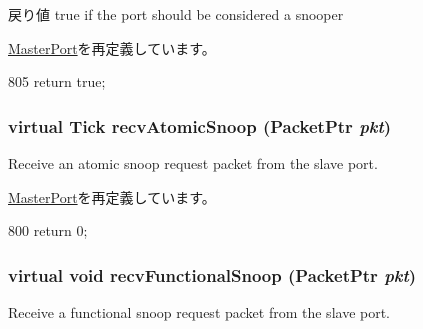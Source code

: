 \begin{DoxyReturn}{戻り値}
true if the port should be considered a snooper 
\end{DoxyReturn}


\hyperlink{classMasterPort_a32602a6a3c3d66a639455036d6c08dd6}{MasterPort}を再定義しています。


\begin{DoxyCode}
805 { return true; }
\end{DoxyCode}
\hypertarget{classArmISA_1_1TableWalker_1_1SnoopingDmaPort_ae1160d8f94f042aba1dc9a07a72e1e82}{
\subsubsection[{recvAtomicSnoop}]{\setlength{\rightskip}{0pt plus 5cm}virtual {\bf Tick} recvAtomicSnoop ({\bf PacketPtr} {\em pkt})}}
\label{classArmISA_1_1TableWalker_1_1SnoopingDmaPort_ae1160d8f94f042aba1dc9a07a72e1e82}
Receive an atomic snoop request packet from the slave port. 

\hyperlink{classMasterPort_ae1160d8f94f042aba1dc9a07a72e1e82}{MasterPort}を再定義しています。


\begin{DoxyCode}
800         { return 0; }
\end{DoxyCode}
\hypertarget{classArmISA_1_1TableWalker_1_1SnoopingDmaPort_af5b15bc08781cf0ba6190efc37d5b67e}{
\subsubsection[{recvFunctionalSnoop}]{\setlength{\rightskip}{0pt plus 5cm}virtual void recvFunctionalSnoop ({\bf PacketPtr} {\em pkt})}}
\label{classArmISA_1_1TableWalker_1_1SnoopingDmaPort_af5b15bc08781cf0ba6190efc37d5b67e}
Receive a functional snoop request packet from the slave port. 

